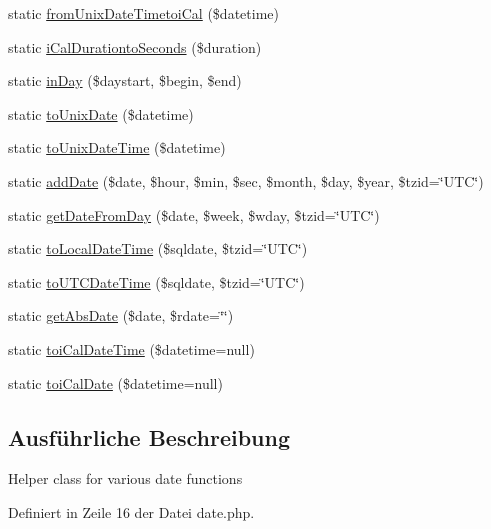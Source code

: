 \begin{DoxyCompactItemize}
\item 
static \mbox{\hyperlink{class_z_date_helper_aac3b0504ccd4a287890e72c98b0b38b1}{from\+Unix\+Date\+Timetoi\+Cal}} (\$datetime)
\item 
static \mbox{\hyperlink{class_z_date_helper_a79c1056abc3d6c5d95e516e3de6bf76e}{i\+Cal\+Durationto\+Seconds}} (\$duration)
\item 
static \mbox{\hyperlink{class_z_date_helper_abd18a3ed0bc7ad987c68ad39943fa486}{in\+Day}} (\$daystart, \$begin, \$end)
\item 
static \mbox{\hyperlink{class_z_date_helper_ac366b0b42b39f55be33ef5b528cfac6a}{to\+Unix\+Date}} (\$datetime)
\item 
static \mbox{\hyperlink{class_z_date_helper_a99a5d6dacb113f1b30aa8c74439402f7}{to\+Unix\+Date\+Time}} (\$datetime)
\item 
static \mbox{\hyperlink{class_z_date_helper_a26dcb637376ca81977e693c547466a30}{add\+Date}} (\$date, \$hour, \$min, \$sec, \$month, \$day, \$year, \$tzid=\char`\"{}U\+TC\char`\"{})
\item 
static \mbox{\hyperlink{class_z_date_helper_a19234db79253cd211a9af517b655d5a2}{get\+Date\+From\+Day}} (\$date, \$week, \$wday, \$tzid=\char`\"{}U\+TC\char`\"{})
\item 
static \mbox{\hyperlink{class_z_date_helper_afcea2d531550680027f1c4301613d6f6}{to\+Local\+Date\+Time}} (\$sqldate, \$tzid=\char`\"{}U\+TC\char`\"{})
\item 
static \mbox{\hyperlink{class_z_date_helper_ae48ebb7e1e9ed5de7c0d3254be081ffb}{to\+U\+T\+C\+Date\+Time}} (\$sqldate, \$tzid=\char`\"{}U\+TC\char`\"{})
\item 
static \mbox{\hyperlink{class_z_date_helper_a30f7c4e722fd5947833ab78e6b52e8fa}{get\+Abs\+Date}} (\$date, \$rdate=\char`\"{}\char`\"{})
\item 
static \mbox{\hyperlink{class_z_date_helper_a128b69a45ab5b5eeedda0cd93f6a9e05}{toi\+Cal\+Date\+Time}} (\$datetime=null)
\item 
static \mbox{\hyperlink{class_z_date_helper_aac48eb1fc2a5a8206b3c18e46f121a14}{toi\+Cal\+Date}} (\$datetime=null)
\end{DoxyCompactItemize}


\subsection{Ausführliche Beschreibung}
Helper class for various date functions 

Definiert in Zeile 16 der Datei date.\+php.



